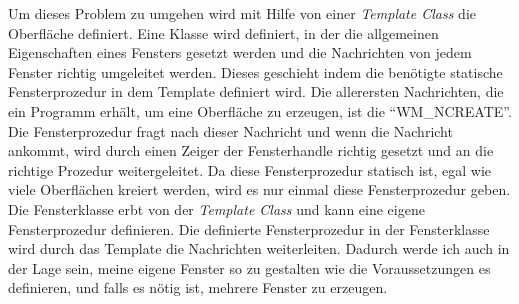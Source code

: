 Um dieses Problem zu umgehen wird mit Hilfe von einer \textit{Template Class} die Oberfläche definiert. Eine Klasse wird definiert, in der die allgemeinen Eigenschaften eines Fensters gesetzt werden und die Nachrichten von jedem Fenster richtig umgeleitet werden. Dieses geschieht indem die benötigte statische Fensterprozedur in dem Template definiert wird. Die allerersten Nachrichten, die ein Programm erhält, um eine Oberfläche zu erzeugen, ist die "`WM\_NCREATE"'. Die Fensterprozedur fragt nach dieser Nachricht und wenn die Nachricht ankommt, wird durch einen Zeiger der Fensterhandle richtig gesetzt und an die richtige Prozedur weitergeleitet. Da diese Fensterprozedur statisch ist, egal wie viele Oberflächen kreiert werden, wird es nur einmal diese Fensterprozedur geben.\\


Die Fensterklasse erbt von der \textit{Template Class} und kann eine eigene Fensterprozedur definieren. Die definierte Fensterprozedur in der Fensterklasse wird durch das Template die Nachrichten weiterleiten. Dadurch werde ich auch in der Lage sein, meine eigene Fenster so zu gestalten wie die Voraussetzungen es definieren, und falls es nötig ist, mehrere Fenster zu erzeugen.